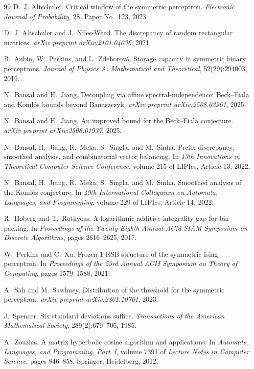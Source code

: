 \documentclass[reqno,english]{amsart}
\theoremstyle{definition}
\begin{document}
\begin{thebibliography}{99}
D.~J. Altschuler.
\newblock Critical window of the symmetric perceptron.
\newblock \emph{Electronic Journal of Probability}, 28, Paper No.~123, 2023.

D.~J. Altschuler and J.~Niles-Weed.
\newblock The discrepancy of random rectangular matrices.
\newblock \emph{arXiv preprint arXiv:2101.04036}, 2021.

B.~Aubin, W.~Perkins, and L.~Zdeborov\'a.
\newblock Storage capacity in symmetric binary perceptrons.
\newblock \emph{Journal of Physics A: Mathematical and Theoretical}, 52(29):294003, 2019.

N.~Bansal and H.~Jiang.
\newblock Decoupling via affine spectral-independence: Beck--Fiala and Koml\'os bounds beyond Banaszczyk.
\newblock \emph{arXiv preprint arXiv:2508.03961}, 2025.

N.~Bansal and H.~Jiang.
\newblock An improved bound for the Beck--Fiala conjecture.
\newblock \emph{arXiv preprint arXiv:2508.01937}, 2025.

N.~Bansal, H.~Jiang, R.~Meka, S.~Singla, and M.~Sinha.
\newblock Prefix discrepancy, smoothed analysis, and combinatorial vector balancing.
\newblock In \emph{13th Innovations in Theoretical Computer Science Conference}, volume 215 of LIPIcs, Article 13, 2022.

N.~Bansal, H.~Jiang, R.~Meka, S.~Singla, and M.~Sinha.
\newblock Smoothed analysis of the Koml\'os conjecture.
\newblock In \emph{49th International Colloquium on Automata, Languages, and Programming}, volume 229 of LIPIcs, Article 14, 2022.

R.~Hoberg and T.~Rothvoss.
\newblock A logarithmic additive integrality gap for bin packing.
\newblock In \emph{Proceedings of the Twenty-Eighth Annual ACM-SIAM Symposium on Discrete Algorithms}, pages 2616--2625, 2017.

W.~Perkins and C.~Xu.
\newblock Frozen $1$-RSB structure of the symmetric Ising perceptron.
\newblock In \emph{Proceedings of the 53rd Annual ACM Symposium on Theory of Computing}, pages 1579--1588, 2021.

A.~Sah and M.~Sawhney.
\newblock Distribution of the threshold for the symmetric perceptron.
\newblock \emph{arXiv preprint arXiv:2301.10701}, 2023.

J.~Spencer.
\newblock Six standard deviations suffice.
\newblock \emph{Transactions of the American Mathematical Society}, 289(2):679--706, 1985.

A.~Zouzias.
\newblock A matrix hyperbolic cosine algorithm and applications.
\newblock In \emph{Automata, Languages, and Programming, Part~I},
volume 7391 of \emph{Lecture Notes in Computer Science},
pages 846--858. Springer, Heidelberg, 2012.

\end{thebibliography}
\end{document}
